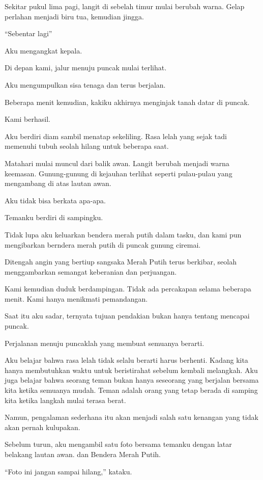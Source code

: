 Sekitar pukul lima pagi, langit di sebelah timur mulai berubah warna. Gelap perlahan menjadi biru tua, kemudian jingga.


“Sebentar lagi”


Aku mengangkat kepala.


Di depan kami, jalur menuju puncak mulai terlihat.


Aku mengumpulkan sisa tenaga dan terus berjalan.


Beberapa menit kemudian, kakiku akhirnya menginjak tanah datar di puncak.


Kami berhasil.


Aku berdiri diam sambil menatap sekeliling. Rasa lelah yang sejak tadi memenuhi tubuh seolah hilang untuk beberapa saat.


Matahari mulai muncul dari balik awan. Langit berubah menjadi warna keemasan. Gunung-gunung di kejauhan terlihat seperti pulau-pulau yang mengambang di atas lautan awan.


Aku tidak bisa berkata apa-apa.


Temanku berdiri di sampingku.


Tidak lupa aku keluarkan bendera merah putih dalam tasku, dan kami pun mengibarkan berndera merah putih di puncak gunung ciremai.


Ditengah angin yang  bertiup sangsaka Merah Putih terus berkibar, seolah menggambarkan semangat keberanian dan perjuangan.


Kami kemudian duduk berdampingan. Tidak ada percakapan selama beberapa menit. Kami hanya menikmati pemandangan.


Saat itu aku sadar, ternyata tujuan pendakian bukan hanya tentang mencapai puncak.


Perjalanan menuju puncaklah yang membuat semuanya berarti.


Aku belajar bahwa rasa lelah tidak selalu berarti harus berhenti. Kadang kita hanya membutuhkan waktu untuk beristirahat sebelum kembali melangkah. Aku juga belajar bahwa seorang teman bukan hanya seseorang yang berjalan bersama kita ketika semuanya mudah. Teman adalah orang yang tetap berada di samping kita ketika langkah mulai terasa berat.


Namun, pengalaman sederhana itu akan menjadi salah satu kenangan yang tidak akan pernah kulupakan.


Sebelum turun, aku mengambil satu foto bersama temanku dengan latar belakang lautan awan. dan Bendera Merah Putih.

 
“Foto ini jangan sampai hilang,” kataku.


